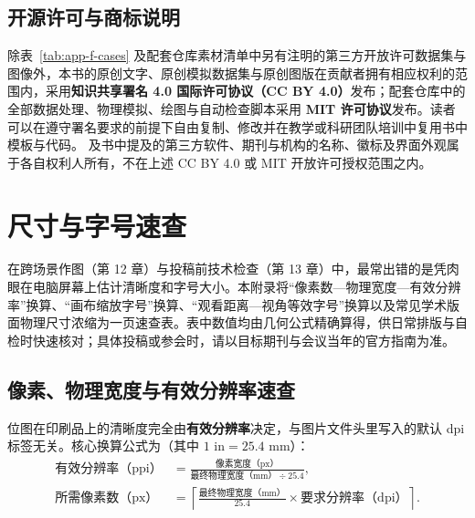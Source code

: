 \section{开源许可与商标说明}

除表~\ref{tab:app-f-cases} 及配套仓库素材清单中另有注明的第三方开放许可数据集与图像外，本书的原创文字、原创模拟数据集与原创图版在贡献者拥有相应权利的范围内，采用\textbf{知识共享署名 4.0 国际许可协议（CC BY 4.0）}发布；配套仓库中的全部数据处理、物理模拟、绘图与自动检查脚本采用 \textbf{MIT 许可协议}发布。读者可以在遵守署名要求的前提下自由复制、修改并在教学或科研团队培训中复用书中模板与代码。\scidraw{} 及书中提及的第三方软件、期刊与机构的名称、徽标及界面外观属于各自权利人所有，不在上述 CC BY 4.0 或 MIT 开放许可授权范围之内。

\chapter{尺寸与字号速查}
\label{app:size-reference}

在跨场景作图（第 12 章）与投稿前技术检查（第 13 章）中，最常出错的是凭肉眼在电脑屏幕上估计清晰度和字号大小。本附录将“像素数—物理宽度—有效分辨率”换算、“画布缩放字号”换算、“观看距离—视角等效字号”换算以及常见学术版面物理尺寸浓缩为一页速查表。表中数值均由几何公式精确算得，供日常排版与自检时快速核对；具体投稿或参会时，请以目标期刊与会议当年的官方指南为准。

\section{像素、物理宽度与有效分辨率速查}

位图在印刷品上的清晰度完全由\textbf{有效分辨率}决定，与图片文件头里写入的默认 dpi 标签无关。核心换算公式为（其中 $1\text{ in} = 25.4\text{ mm}$）：
\begin{align*}
  \text{有效分辨率（ppi）} &= \frac{\text{像素宽度（px）}}{\text{最终物理宽度（mm）} \div 25.4}, \\
  \text{所需像素数（px）} &= \left\lceil \frac{\text{最终物理宽度（mm）}}{25.4} \times \text{要求分辨率（dpi）} \right\rceil .
\end{align*}

